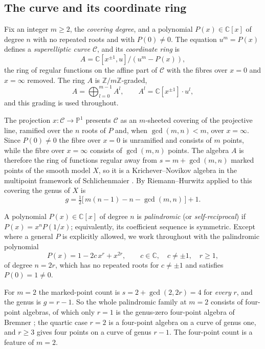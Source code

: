 \documentclass[11pt]{amsart}
\theoremstyle{definition}
\theoremstyle{remark}
\newcommand{\C}{\mathbb{C}}
\newcommand{\Z}{\mathbb{Z}}
\begin{document}
\subsection{The curve and its coordinate ring}
\label{subsec:curve}

Fix an integer $m\geq2$, the \emph{covering degree}, and a polynomial
$P(x)\in\C[x]$ of degree $n$ with no repeated roots and with $P(0)\neq0$. The
equation $u^m=P(x)$ defines a \emph{superelliptic curve} $\mathscr C$, and its
\emph{coordinate ring} is
\[
  A = \C[x^{\pm1},u]\big/(u^m-P(x)),
\]
the ring of regular functions on the affine part of $\mathscr C$ with the
fibres over $x=0$ and $x=\infty$ removed. The ring $A$ is $\Z/m\Z$-graded,
\[
  A=\bigoplus_{l=0}^{m-1}A^l,\qquad A^l=\C[x^{\pm1}]\cdot u^l ,
\]
and this grading is used throughout.

The projection $x\colon\mathscr C\to\mathbb P^1$ presents $\mathscr C$ as an
$m$-sheeted covering of the projective line, ramified over the $n$ roots of $P$
and, when $\gcd(m,n)<m$, over $x=\infty$. Since $P(0)\neq0$ the fibre over
$x=0$ is unramified and consists of $m$ points, while the fibre over
$x=\infty$ consists of $\gcd(m,n)$ points. The algebra $A$ is therefore the
ring of functions regular away from $s=m+\gcd(m,n)$ marked points of the
smooth model $X$, so it is a Krichever--Novikov algebra in the multipoint
framework of Schlichenmaier
\cite{Schlichenmaier1990a,Schlichenmaier1990b,Schlichenmaier2014}. By Riemann--Hurwitz applied to this covering the genus of $X$ is
\[
  g = \tfrac12\bigl[\,m(n-1)-n-\gcd(m,n)\,\bigr]+1 .
\]

A polynomial $P(x)\in\C[x]$ of degree $n$ is \emph{palindromic} (or
\emph{self-reciprocal}) if $P(x)=x^{n}P(1/x)$; equivalently, its coefficient
sequence is symmetric. Except where a general $P$ is explicitly allowed, we work
throughout with the palindromic polynomial
\begin{equation}\label{eq:palindromic_P}
  P(x) = 1 - 2c\,x^r + x^{2r},\qquad c\in\C,\quad c\neq\pm1,\quad r\geq1,
\end{equation}
of degree $n=2r$, which has no repeated roots for $c\neq\pm1$ and satisfies
$P(0)=1\neq0$.

For $m=2$ the marked-point count is $s=2+\gcd(2,2r)=4$ for \emph{every} $r$, and
the genus is $g=r-1$. So the whole palindromic family at $m=2$ consists of
four-point algebras, of which only $r=1$ is the genus-zero four-point algebra of
Bremner \cite[Prop.~1.1]{Bremner1995}; the quartic case $r=2$ is a four-point
algebra on a curve of genus one, and $r\geq3$ gives four points on a curve of
genus $r-1$. The four-point count is a feature of $m=2$.
\end{document}
